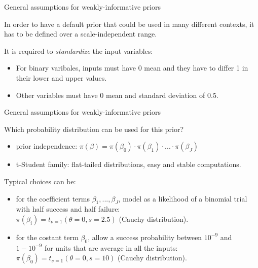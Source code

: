 \documentclass{beamer}
\begin{document}
\begin{frame}{General assumptions for weakly-informative priors}
	
	In order to have a default prior that could be used in many different contexts, it has to be defined over a scale-independent range.
	
	\vspace{0.4cm}
	It is required to \textit{standardize} the input variables:
	\begin{itemize}
		\item For binary varibales, inputs must have 0 mean and they have to differ 1 in their lower and upper values.
		\item Other variables must have 0 mean and standard deviation of 0.5.
	\end{itemize}
	
\end{frame}

\begin{frame}{General assumptions for weakly-informative priors}
	
	Which probability distribution can be used for this prior?
	
	\vspace{0.2cm}
	
	\begin{itemize}
		\item prior independence: $\pi(\beta) = \pi(\beta_0) \cdot \pi(\beta_1) \cdot ... \cdot \pi(\beta_J)$ 
		\item t-Student family: flat-tailed distributions, easy and stable computations.
	\end{itemize}
	Typical choices can be:
	\begin{itemize}
		\item  for the coefficient terms $\beta_1, ..., \beta_J$, model as a likelihood of a binomial trial with half success and half failure:  \\
		$\pi(\beta_i) = t_{\nu=1}(\theta=0, s=2.5)$ (Cauchy distribution).
		\vspace{0.3cm}
		\item for the costant term $\beta_0$, allow a success probability between $10^{-9}$ and $1-10^{-9}$ for units
		that are average in all the inputs: \\
		$\pi(\beta_0) = t_{\nu=1}(\theta=0, s=10)$ (Cauchy distribution).
	\end{itemize}
	
\end{frame}
\end{document}
